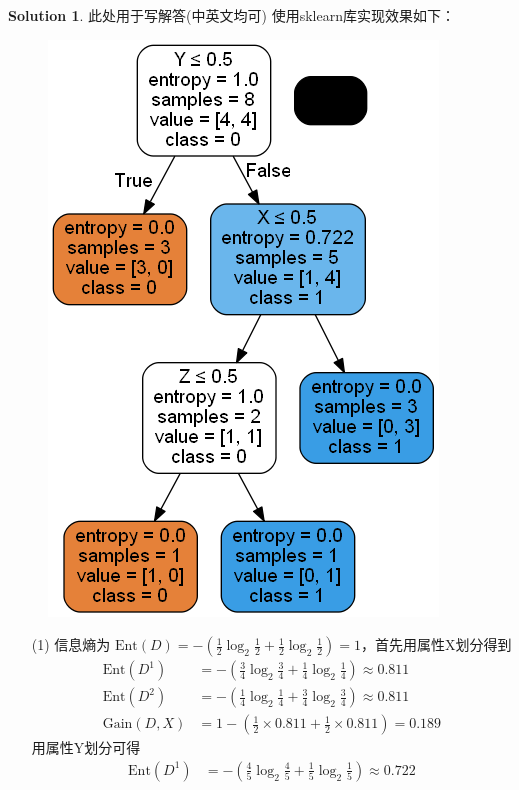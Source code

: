 \documentclass[a4paper,UTF8]{article}
\numberwithin{equation}{section}
\theoremstyle{definition}
\newtheorem*{solution}{Solution}
\begin{document}
\begin{solution}
	此处用于写解答(中英文均可)
	使用sklearn库实现效果如下：
	\begin{figure}[H] \centering  \includegraphics[scale=0.5]{tree.png} \end{figure}
	\begin{enumerate}
		\item[(1)]
		信息熵为 $\text{Ent}(D) = -(\frac{1}{2}\log_2 \frac{1}{2} + \frac{1}{2}\log_{2}\frac{1}{2}) = 1$，首先用属性X划分得到
		\begin{align*}
			\text{Ent}(D^1) &= -\left(\frac{3}{4}\log_2 \frac{3}{4} + \frac{1}{4}\log_2 \frac{1}{4}\right) \approx 0.811 \\
			\text{Ent}(D^2) &= -\left(\frac{1}{4}\log_2 \frac{1}{4} + \frac{3}{4}\log_2 \frac{3}{4}\right) \approx 0.811 \\
			\text{Gain}(D,X) &= 1-\left(\frac{1}{2}\times 0.811 + \frac{1}{2}\times 0.811\right) = 0.189
		\end{align*}
		用属性Y划分可得
		\begin{align*}
			\text{Ent}(D^1) &= -\left(\frac{4}{5}\log_2 \frac{4}{5} + \frac{1}{5}\log_2 \frac{1}{5}\right) \approx 0.722 \\

\end{align*}
\end{enumerate}
\end{solution}
\end{document}
